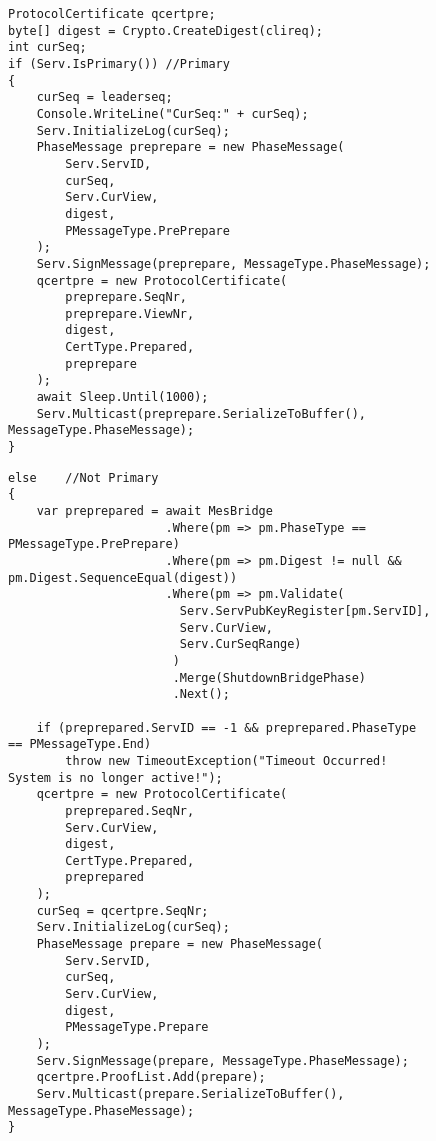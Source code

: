 \begin{figure}[H]
	\centering
	\begin{lstlisting}[label = code:Pre-PreparePrimary, caption= Source code for pre-prepare phase for primary replica, captionpos = b, basicstyle=\scriptsize]
ProtocolCertificate qcertpre;
byte[] digest = Crypto.CreateDigest(clireq);
int curSeq; 
if (Serv.IsPrimary()) //Primary
{
    curSeq = leaderseq;
    Console.WriteLine("CurSeq:" + curSeq);
    Serv.InitializeLog(curSeq);
    PhaseMessage preprepare = new PhaseMessage(
        Serv.ServID, 
    	curSeq, 
        Serv.CurView, 
        digest, 
        PMessageType.PrePrepare
    );
    Serv.SignMessage(preprepare, MessageType.PhaseMessage);
    qcertpre = new ProtocolCertificate(
        preprepare.SeqNr, 
        preprepare.ViewNr, 
        digest, 
        CertType.Prepared, 
        preprepare
    );
    await Sleep.Until(1000);
    Serv.Multicast(preprepare.SerializeToBuffer(), MessageType.PhaseMessage);
}
	\end{lstlisting}
\end{figure}

\begin{figure}[H]
	\centering
	\begin{lstlisting}[label = code:Pre-PrepareNonPrimary, caption= Source code for Pre-prepare phase for non-primary replica, captionpos = b, basicstyle=\scriptsize]
else	//Not Primary
{ 
    var preprepared = await MesBridge
    	              .Where(pm => pm.PhaseType == PMessageType.PrePrepare)
                      .Where(pm => pm.Digest != null && pm.Digest.SequenceEqual(digest))
                      .Where(pm => pm.Validate(
                        Serv.ServPubKeyRegister[pm.ServID],
                        Serv.CurView, 
                        Serv.CurSeqRange)
                       )
                       .Merge(ShutdownBridgePhase)
                       .Next();
                
    if (preprepared.ServID == -1 && preprepared.PhaseType == PMessageType.End) 
        throw new TimeoutException("Timeout Occurred! System is no longer active!");
    qcertpre = new ProtocolCertificate(
        preprepared.SeqNr, 
        Serv.CurView, 
        digest, 
        CertType.Prepared, 
        preprepared
    );
    curSeq = qcertpre.SeqNr; 
    Serv.InitializeLog(curSeq);
    PhaseMessage prepare = new PhaseMessage(
        Serv.ServID, 
        curSeq, 
        Serv.CurView, 
        digest, 
        PMessageType.Prepare
    );
    Serv.SignMessage(prepare, MessageType.PhaseMessage);
    qcertpre.ProofList.Add(prepare);
    Serv.Multicast(prepare.SerializeToBuffer(), MessageType.PhaseMessage);
}
	\end{lstlisting}
\end{figure}		

